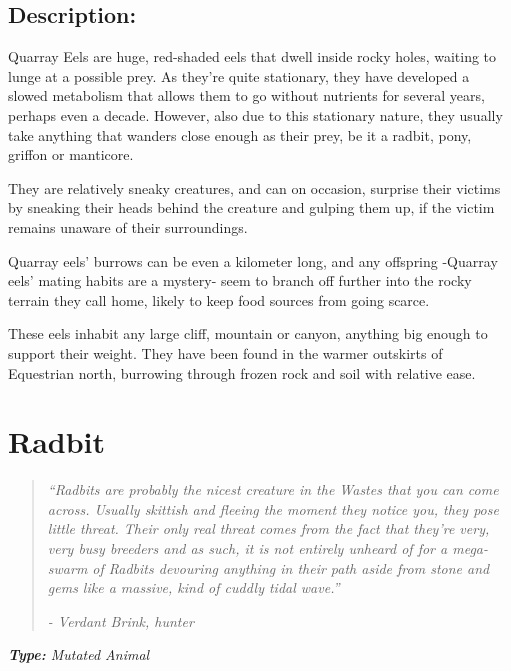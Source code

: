 \documentclass[11pt,a4paper,twocolumn]{book}
\begin{document}
	\subsection*{Description:}
	Quarray Eels are huge, red-shaded eels that dwell inside rocky holes, waiting to lunge at a possible prey. As they're quite stationary, they have developed a slowed metabolism that allows them to go without nutrients for several years, perhaps even a decade. However, also due to this stationary nature, they usually take anything that wanders close enough as their prey, be it a radbit, pony, griffon or manticore.
	
	They are relatively sneaky creatures, and can on occasion, surprise their victims by sneaking their heads behind the creature and gulping them up, if the victim remains unaware of their surroundings.
	
	Quarray eels' burrows can be even a kilometer long, and any offspring -Quarray eels' mating habits are a mystery- seem to branch off further into the rocky terrain they call home, likely to keep food sources from going scarce.
	
	These eels inhabit any large cliff, mountain or canyon, anything big enough to support their weight. They have been found in the warmer outskirts of Equestrian north, burrowing through frozen rock and soil with relative ease.
	
	\clearpage
	
	\section*{Radbit}
	\begin{quote}
		\emph{``Radbits are probably the nicest creature in the Wastes that you can come across. Usually skittish and fleeing the moment they notice you, they pose little threat. Their only real threat comes from the fact that they're very, very busy breeders and as such, it is not entirely unheard of for a mega-swarm of Radbits devouring anything in their path aside from stone and gems like a massive, kind of cuddly tidal wave.''}
		
		\emph{-	Verdant Brink, hunter}
	\end{quote}
	
	\emph{\textbf{Type:} Mutated Animal}
	
\end{document}
